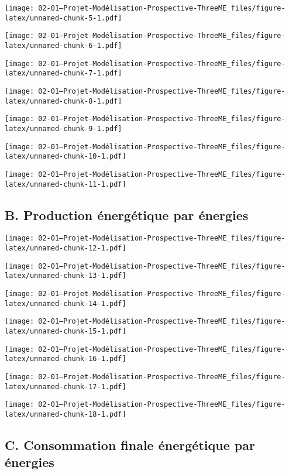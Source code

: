 \documentclass[
]{article}
\begin{document}
\texttt{[image: 02-01---Projet-Modélisation-Prospective-ThreeME\_files/figure-latex/unnamed-chunk-5-1.pdf]}

\texttt{[image: 02-01---Projet-Modélisation-Prospective-ThreeME\_files/figure-latex/unnamed-chunk-6-1.pdf]}

\texttt{[image: 02-01---Projet-Modélisation-Prospective-ThreeME\_files/figure-latex/unnamed-chunk-7-1.pdf]}

\texttt{[image: 02-01---Projet-Modélisation-Prospective-ThreeME\_files/figure-latex/unnamed-chunk-8-1.pdf]}

\texttt{[image: 02-01---Projet-Modélisation-Prospective-ThreeME\_files/figure-latex/unnamed-chunk-9-1.pdf]}

\texttt{[image: 02-01---Projet-Modélisation-Prospective-ThreeME\_files/figure-latex/unnamed-chunk-10-1.pdf]}

\texttt{[image: 02-01---Projet-Modélisation-Prospective-ThreeME\_files/figure-latex/unnamed-chunk-11-1.pdf]}

\hypertarget{b.-production-uxe9nerguxe9tique-par-uxe9nergies}{%
\subsection{B. Production énergétique par
énergies}\label{b.-production-uxe9nerguxe9tique-par-uxe9nergies}}

\texttt{[image: 02-01---Projet-Modélisation-Prospective-ThreeME\_files/figure-latex/unnamed-chunk-12-1.pdf]}

\texttt{[image: 02-01---Projet-Modélisation-Prospective-ThreeME\_files/figure-latex/unnamed-chunk-13-1.pdf]}

\texttt{[image: 02-01---Projet-Modélisation-Prospective-ThreeME\_files/figure-latex/unnamed-chunk-14-1.pdf]}

\texttt{[image: 02-01---Projet-Modélisation-Prospective-ThreeME\_files/figure-latex/unnamed-chunk-15-1.pdf]}

\texttt{[image: 02-01---Projet-Modélisation-Prospective-ThreeME\_files/figure-latex/unnamed-chunk-16-1.pdf]}

\texttt{[image: 02-01---Projet-Modélisation-Prospective-ThreeME\_files/figure-latex/unnamed-chunk-17-1.pdf]}

\texttt{[image: 02-01---Projet-Modélisation-Prospective-ThreeME\_files/figure-latex/unnamed-chunk-18-1.pdf]}

\hypertarget{c.-consommation-finale-uxe9nerguxe9tique-par-uxe9nergies}{%
\subsection{C. Consommation finale énergétique par
énergies}\label{c.-consommation-finale-uxe9nerguxe9tique-par-uxe9nergies}}
\end{document}
